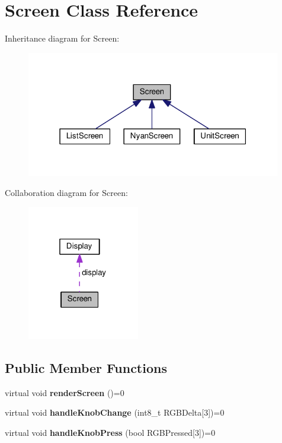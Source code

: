 \hypertarget{classScreen}{}\section{Screen Class Reference}
\label{classScreen}


Inheritance diagram for Screen\+:\nopagebreak
\begin{figure}[H]
\begin{center}
\leavevmode
\includegraphics[width=315pt]{classScreen__inherit__graph}
\end{center}
\end{figure}


Collaboration diagram for Screen\+:\nopagebreak
\begin{figure}[H]
\begin{center}
\leavevmode
\includegraphics[width=139pt]{classScreen__coll__graph}
\end{center}
\end{figure}
\subsection*{Public Member Functions}
\begin{DoxyCompactItemize}
\item 
virtual void {\bfseries render\+Screen} ()=0\hypertarget{classScreen_afd1cb4a4bfbbec56cc64c973a9242110}{}\label{classScreen_afd1cb4a4bfbbec56cc64c973a9242110}

\item 
virtual void {\bfseries handle\+Knob\+Change} (int8\+\_\+t R\+G\+B\+Delta\mbox{[}3\mbox{]})=0\hypertarget{classScreen_a4c3869a19704ec2530a377618b3f6104}{}\label{classScreen_a4c3869a19704ec2530a377618b3f6104}

\item 
virtual void {\bfseries handle\+Knob\+Press} (bool R\+G\+B\+Pressed\mbox{[}3\mbox{]})=0\hypertarget{classScreen_a1b9547f8f48c3ceae2024b58e0746e94}{}\label{classScreen_a1b9547f8f48c3ceae2024b58e0746e94}

\end{DoxyCompactItemize}
